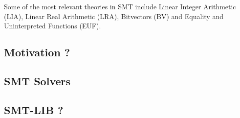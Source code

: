 Some of the most relevant theories in SMT include Linear Integer Arithmetic (LIA), Linear Real Arithmetic (LRA), Bitvectors (BV) and Equality and Uninterpreted Functions (EUF).



\subsection{Motivation ?}

\subsection{SMT Solvers}

\subsection{SMT-LIB ?}




